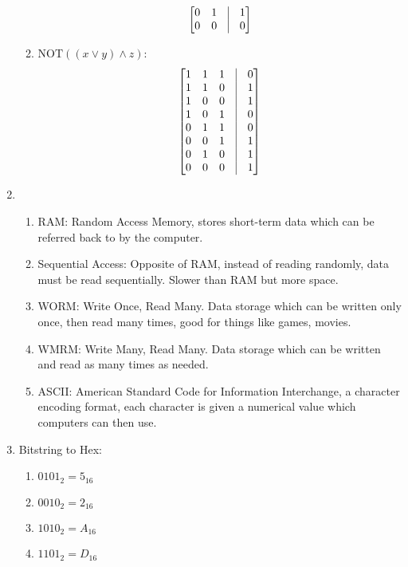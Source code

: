 \documentclass[hidelinks,12pt]{article}
\begin{document}
\begin{enumerate}
\begin{enumerate}
\[\begin{bmatrix}
                0 & 1 & \vline & 1\\
                0 & 0 & \vline & 0\\
                \end{bmatrix}\]
            \item $\mathrm{NOT}((x\lor y)\land z)$:
                \[\begin{bmatrix}
                    1 & 1 & 1 & \vline & 0\\
                    1 & 1 & 0 & \vline & 1\\
                    1 & 0 & 0 & \vline & 1\\
                    1 & 0 & 1 & \vline & 0\\
                    0 & 1 & 1 & \vline & 0\\
                    0 & 0 & 1 & \vline & 1\\
                    0 & 1 & 0 & \vline & 1\\
                    0 & 0 & 0 & \vline & 1\\
                \end{bmatrix}\]
    \end{enumerate}
    \item\begin{enumerate}
        \item RAM: Random Access Memory, stores short-term data which can be referred back to by the computer.
        \item Sequential Access: Opposite of RAM, instead of reading randomly, data must be read sequentially. Slower than RAM but more space.
        \item WORM: Write Once, Read Many. Data storage which can be written only once, then read many times, good for things like games, movies.
        \item WMRM: Write Many, Read Many. Data storage which can be written and read as many times as needed.
        \item ASCII: American Standard Code for Information Interchange, a character encoding format, each character is given a numerical value which computers can then use.
    \end{enumerate}
\item Bitstring to Hex:\begin{enumerate}
            \item $0101_2=5_{16}$
            \item $0010_2=2_{16}$
        \item $1010_2=A_{16}$
        \item $1101_2=D_{16}$

\end{enumerate}
\end{enumerate}
\end{document}
